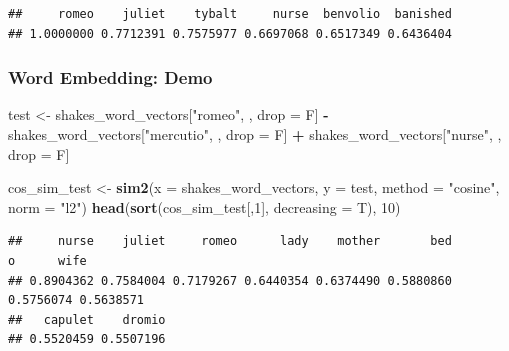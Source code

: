 \documentclass[
  shownotes,
  xcolor={svgnames},
  hyperref={colorlinks,citecolor=DarkBlue,linkcolor=DarkRed,urlcolor=DarkBlue}
  , aspectratio=169]{beamer}
\newenvironment{Shaded}{\begin{snugshade}}{\end{snugshade}}
\newcommand{\DataTypeTok}[1]{\textcolor[rgb]{0.13,0.29,0.53}{#1}}
\newcommand{\DecValTok}[1]{\textcolor[rgb]{0.00,0.00,0.81}{#1}}
\newcommand{\KeywordTok}[1]{\textcolor[rgb]{0.13,0.29,0.53}{\textbf{#1}}}
\newcommand{\NormalTok}[1]{#1}
\newcommand{\OperatorTok}[1]{\textcolor[rgb]{0.81,0.36,0.00}{\textbf{#1}}}
\newcommand{\StringTok}[1]{\textcolor[rgb]{0.31,0.60,0.02}{#1}}
\begin{document}
\begin{frame}[fragile]
\begin{scriptsize}
\end{scriptsize}
\begin{tiny}

\begin{verbatim}
##     romeo    juliet    tybalt     nurse  benvolio  banished  
## 1.0000000 0.7712391 0.7575977 0.6697068 0.6517349 0.6436404  
\end{verbatim}
\end{tiny}


\end{frame}

\begin{frame}[fragile]
\frametitle{Word Embedding: Demo }

\begin{scriptsize}


\begin{Shaded}
\begin{Highlighting}[]
\NormalTok{test \textless{}{-}}\StringTok{ }\NormalTok{shakes\_word\_vectors[}\StringTok{"romeo"}\NormalTok{, , drop =}\StringTok{ }\NormalTok{F] }\OperatorTok{{-}}
\StringTok{  }\NormalTok{shakes\_word\_vectors[}\StringTok{"mercutio"}\NormalTok{, , drop =}\StringTok{ }\NormalTok{F] }\OperatorTok{+}
\StringTok{  }\NormalTok{shakes\_word\_vectors[}\StringTok{"nurse"}\NormalTok{, , drop =}\StringTok{ }\NormalTok{F]}

\NormalTok{cos\_sim\_test \textless{}{-}}\StringTok{ }\KeywordTok{sim2}\NormalTok{(}\DataTypeTok{x =}\NormalTok{ shakes\_word\_vectors, }\DataTypeTok{y =}\NormalTok{ test, }\DataTypeTok{method =} \StringTok{"cosine"}\NormalTok{, }\DataTypeTok{norm =} \StringTok{"l2"}\NormalTok{)}
\KeywordTok{head}\NormalTok{(}\KeywordTok{sort}\NormalTok{(cos\_sim\_test[,}\DecValTok{1}\NormalTok{], }\DataTypeTok{decreasing =}\NormalTok{ T), }\DecValTok{10}\NormalTok{)}
\end{Highlighting}
\end{Shaded}
\end{scriptsize}
\begin{tiny}


\begin{verbatim}
##     nurse    juliet     romeo      lady    mother       bed         o      wife 
## 0.8904362 0.7584004 0.7179267 0.6440354 0.6374490 0.5880860 0.5756074 0.5638571 
##   capulet    dromio 
## 0.5520459 0.5507196
\end{verbatim}
\end{tiny}



\end{frame}
\end{document}
